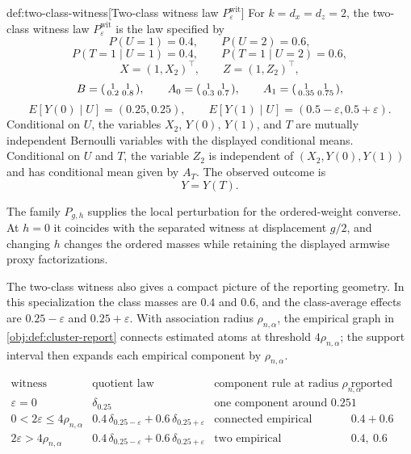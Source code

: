 \documentclass[11pt]{article}
\begin{document}
\begin{definitionv}{def:two-class-witness}[Two-class witness law \(P_{\varepsilon}^{\mathrm{wit}}\)]
For \(k=d_x=d_z=2\), the two-class witness law \(P_{\varepsilon}^{\mathrm{wit}}\) is the law specified by
\[
P(U=1)=0.4,\qquad P(U=2)=0.6,
\]
\[
P(T=1\mid U=1)=0.4,\qquad P(T=1\mid U=2)=0.6,
\]
\[
X=(1,X_2)^\top,\qquad Z=(1,Z_2)^\top,
\]
\[
B=\begin{psmallmatrix}1&1\\0.2&0.8\end{psmallmatrix},
\qquad
A_0=\begin{psmallmatrix}1&1\\0.3&0.7\end{psmallmatrix},
\qquad
A_1=\begin{psmallmatrix}1&1\\0.35&0.75\end{psmallmatrix},
\]
\[
E[Y(0)\mid U]=(0.25,0.25),
\qquad
E[Y(1)\mid U]=(0.5-\varepsilon,0.5+\varepsilon).
\]
Conditional on \(U\), the variables \(X_2\), \(Y(0)\), \(Y(1)\), and \(T\) are mutually independent Bernoulli variables with the displayed conditional means. Conditional on \(U\) and \(T\), the variable \(Z_2\) is independent of \((X_2,Y(0),Y(1))\) and has conditional mean given by \(A_T\). The observed outcome is
\[
Y=Y(T).
\]
\end{definitionv}

The family \(P_{g,h}\) supplies the local perturbation for the ordered-weight converse. At \(h=0\) it coincides with the separated witness at displacement \(g/2\), and changing \(h\) changes the ordered masses while retaining the displayed armwise proxy factorizations.

The two-class witness also gives a compact picture of the reporting geometry. In this specialization the class masses are \(0.4\) and \(0.6\), and the class-average effects are \(0.25-\varepsilon\) and \(0.25+\varepsilon\). With association radius \(\rho_{n,\alpha}\), the empirical graph in \cref{obj:def:cluster-report} connects estimated atoms at threshold \(4\rho_{n,\alpha}\); the support interval then expands each empirical component by \(\rho_{n,\alpha}\).

\[
\begin{array}{c|c|c|c}
\text{witness regime} & \text{quotient law} & \text{component rule at radius }\rho_{n,\alpha} & \text{reported mass target}\\
\hline
\varepsilon=0
& \delta_{0.25}
& \text{one component around }0.25
& 1\\
0<2\varepsilon\le 4\rho_{n,\alpha}
& 0.4\,\delta_{0.25-\varepsilon}+0.6\,\delta_{0.25+\varepsilon}
& \text{connected empirical component}
& 0.4+0.6\\
2\varepsilon>4\rho_{n,\alpha}
& 0.4\,\delta_{0.25-\varepsilon}+0.6\,\delta_{0.25+\varepsilon}
& \text{two empirical components when the center is separated}
& 0.4,\ 0.6
\end{array}
\]
\end{document}
